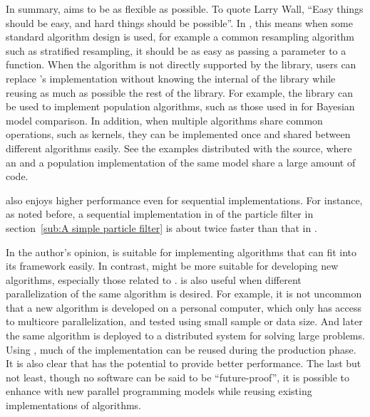 \documentclass[11pt, bib, hyper, mint, minted=cache]{marticle}
\begin{document}
In summary, \vsmc aims to be as flexible as possible. To quote Larry Wall,
``Easy things should be easy, and hard things should be possible''. In \vsmc,
this means when some standard algorithm design is used, for example a common
resampling algorithm such as stratified resampling, it should be as easy as
passing a parameter to a \vsmc function. When the algorithm is not directly
supported by the library, users can replace \vsmc's implementation without
knowing the internal of the library while reusing as much as possible the rest
of the library. For example, the library can be used to implement population
\mcmc algorithms, such as those used in \textcite{Calderhead:2009bd} for
Bayesian model comparison. In addition, when multiple algorithms share common
operations, such as \mcmc kernels, they can be implemented once and shared
between different algorithms easily. See the examples distributed with the
source, where an \smc and a population \mcmc implementation of the same \gmm
model share a large amount of code.

\vsmc also enjoys higher performance even for sequential implementations. For
instance, as noted before, a sequential implementation in \vsmc of the
particle filter in section~\ref{sub:A simple particle filter} is about twice
faster than that in \lsmctc.

In the author's opinion, \lsmctc is suitable for implementing algorithms that
can fit into its framework easily. In contrast, \vsmc might be more suitable
for developing new algorithms, especially those related to \smc. \vsmc is also
useful when different parallelization of the same algorithm is desired. For
example, it is not uncommon that a new algorithm is developed on a personal
computer, which only has access to multicore parallelization, and tested using
small sample or data size. And later the same algorithm is deployed to a
distributed system for solving large problems. Using \vsmc, much of the
implementation can be reused during the production phase. It is also clear
that \vsmc has the potential to provide better performance. The last but not
least, though no software can be said to be ``future-proof'', it is possible
to enhance \vsmc with new parallel programming models while reusing existing
implementations of algorithms.

\printbibliography[heading=reference]
\end{document}
